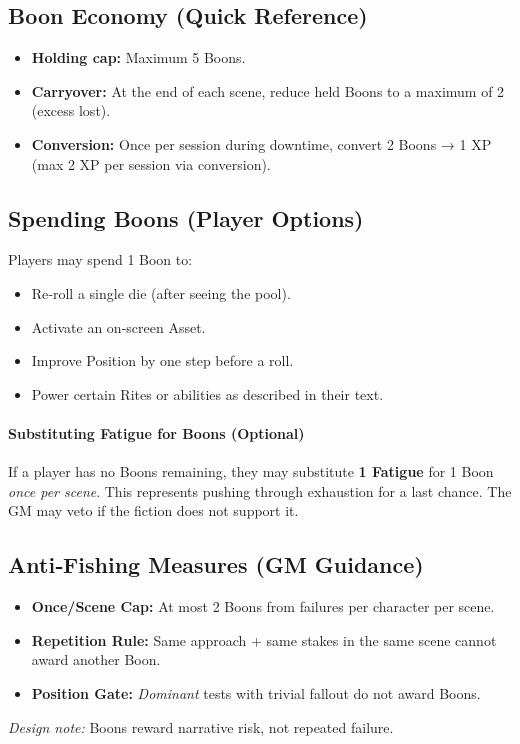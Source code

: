 \subsection{Boon Economy (Quick Reference)}
\label{subsec:boons-economy}

\begin{itemize}
  \item \textbf{Holding cap:} Maximum 5 Boons.
  \item \textbf{Carryover:} At the end of each scene, reduce held Boons to a maximum of 2 (excess lost).
  \item \textbf{Conversion:} Once per session during downtime, convert 2 Boons → 1 XP (max 2 XP per session via conversion).
\end{itemize}

\subsection{Spending Boons (Player Options)}
\label{subsec:boons-spend}

Players may spend 1 Boon to:
\begin{itemize}
  \item Re‑roll a single die (after seeing the pool).
  \item Activate an on‑screen Asset.
  \item Improve Position by one step before a roll.
  \item Power certain Rites or abilities as described in their text.
\end{itemize}

\paragraph{Substituting Fatigue for Boons (Optional)}
If a player has no Boons remaining, they may substitute \textbf{1 Fatigue} for 1 Boon \textit{once per scene}. This represents pushing through exhaustion for a last chance. The GM may veto if the fiction does not support it.

\subsection{Anti‑Fishing Measures (GM Guidance)}
\label{subsec:boons-anti-fishing}

\begin{itemize}
  \item \textbf{Once/Scene Cap:} At most 2 Boons from failures per character per scene.
  \item \textbf{Repetition Rule:} Same approach + same stakes in the same scene cannot award another Boon.
  \item \textbf{Position Gate:} \textit{Dominant} tests with trivial fallout do not award Boons.
\end{itemize}
\emph{Design note:} Boons reward narrative risk, not repeated failure.

